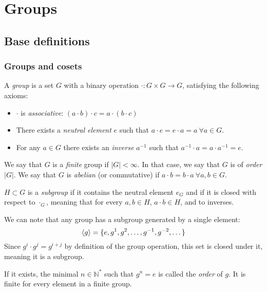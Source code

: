 \chapter{Groups}

\section{Base definitions}

\subsection{Groups and cosets}

\begin{definition}
  A \emph{group} is a set $G$ with a binary operation $\cdot: G \times G \to G$, satisfying the following axioms: 
  \begin{itemize}
    \item $\cdot$ is \emph{associative}: $(a \cdot b) \cdot c = a \cdot (b \cdot c)$
    \item There exists a \emph{neutral element} $e$ such that $a \cdot e = e \cdot a = a \ \forall a \in G$. 
    \item For any $a \in G$ there exists an \emph{inverse} $a^{-1}$ such that $a^{-1} \cdot a = a \cdot a^{-1} = e$. 
  \end{itemize}
  We say that $G$ is a \emph{finite} group if $|G| < \infty$. In that case, we say that $G$ is of \emph{order} $|G|$. 
  We say that $G$ is \emph{abelian} (or commutative) if $a\cdot b = b\cdot a \ \forall a, b \in G$. 
\end{definition}
\begin{definition}
  $H \subset G$ is a \emph{subgroup} if it contains the neutral element $e_G$ and if it is closed with respect to $\cdot_G$, meaning that for every $a, b \in H$, $a\cdot b \in H$, and to inverses. 
\end{definition}

We can note that any group has a subgroup generated by a single element:
\[
  \langle g \rangle = \{e, g^{1}, g^{2}, \dots, g^{-1}, g^{-2}, \dots\}
\]
Since $g^i \cdot g^j = g^{i + j}$ by definition of the group operation, this set is closed under it, meaning it is a subgroup. 

\begin{definition}
  If it exists, the minimal $n \in \mathbb{N}^*$ such that $g^n = e$ is called the \emph{order} of $g$. It is finite for every element in a finite group. 
\end{definition}

